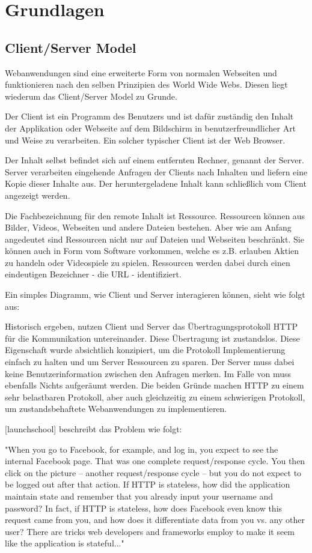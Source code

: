 \chapter{Grundlagen}

\section{Client/Server Model}

Webanwendungen sind eine erweiterte Form von normalen Webseiten und funktionieren nach den selben Prinzipien des World Wide Webs. Diesen liegt wiederum das Client/Server Model zu Grunde.

Der Client ist ein Programm des Benutzers und ist dafür zuständig den Inhalt der Applikation oder Webseite auf dem Bildschirm in benutzerfreundlicher Art und Weise zu verarbeiten. Ein solcher typischer Client ist der Web Browser.

Der Inhalt selbst befindet sich auf einem entfernten Rechner, genannt der Server. Server verarbeiten eingehende Anfragen der Clients nach Inhalten und liefern eine Kopie dieser Inhalte aus.
Der heruntergeladene Inhalt kann schließlich vom Client angezeigt werden.

Die Fachbezeichnung für den remote Inhalt ist Ressource. Ressourcen können aus Bilder, Videos, Webseiten und andere Dateien bestehen. Aber wie am Anfang angedeutet sind Ressourcen nicht nur auf Dateien und Webseiten beschränkt. Sie können auch in Form vom Software vorkommen, welche es z.B. erlauben
Aktien zu handeln oder Videospiele zu spielen. Ressourcen werden dabei durch einen eindeutigen Bezeichner - die URL - identifiziert.

Ein simples Diagramm, wie Client und Server interagieren können, sieht wie folgt aus:

Historisch ergeben, nutzen Client und Server das Übertragungsprotokoll HTTP für die Kommunikation untereinander. Diese Übertragung ist zustandslos. Diese Eigenschaft wurde absichtlich konzipiert, um die Protokoll Implementierung einfach zu halten und um Server Ressourcen zu sparen. Der Server muss dabei keine Benutzerinformation zwischen den Anfragen merken. Im Falle von muss ebenfalls Nichts aufgeräumt werden. Die beiden Gründe machen HTTP zu einem sehr belastbaren Protokoll, aber auch gleichzeitig zu einem schwierigen Protokoll, um zustandsbehaftete Webanwendungen zu implementieren.

[launchschool] beschreibt das Problem wie folgt:

"When you go to Facebook, for example, and log in, you expect to see the internal Facebook page. That was one complete request/response cycle. You then click on the picture -- another request/response cycle -- but you do not expect to be logged out after that action. If HTTP is stateless, how did the application maintain state and remember that you already input your username and password? In fact, if HTTP is stateless, how does Facebook even know this request came from you, and how does it differentiate data from you vs. any other user? There are tricks web developers and frameworks employ to make it seem like the application is stateful..."

